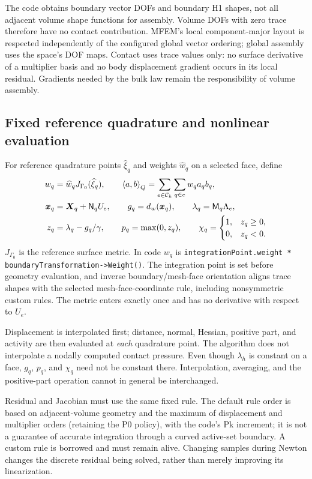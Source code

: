 \documentclass[preprint,11pt]{elsarticle}
\numberwithin{equation}{section}
\newcommand{\bx}{\boldsymbol{x}}
\newcommand{\bX}{\boldsymbol{X}}
\newcommand{\iq}[2]{\left\langle #1,#2\right\rangle_Q}
\newcommand{\code}[1]{\texttt{\nolinkurl{#1}}}
\begin{document}
The code obtains boundary vector DOFs and boundary H1 shapes, not all
adjacent volume shape functions for assembly. Volume DOFs with zero trace
therefore have no contact contribution. MFEM's local component-major
layout is respected independently of the configured global vector ordering;
global assembly uses the space's DOF maps. Contact uses trace values only:
no surface derivative of a multiplier basis and no body displacement
gradient occurs in its local residual. Gradients needed by the bulk law
remain the responsibility of volume assembly.

\subsection{Fixed reference quadrature and nonlinear evaluation}
For reference quadrature points $\widehat{\xi}_q$ and weights
$\widehat w_q$ on a selected face, define
\begin{align}
 w_q&=\widehat w_q J_{\Gamma_0}(\widehat{\xi}_q),\qquad
 \iq{a}{b}=\sum_{e\in\mathcal C_h}\sum_{q\in e}w_q a_qb_q,
 \label{eq:quadrature}\\
 \bx_q&=\bX_q+\mathsf N_q U_e,\qquad
 g_q=d_w(\bx_q),\qquad \lambda_q=\mathsf M_q\Lambda_e,\notag\\
 z_q&=\lambda_q-g_q/\gamma,\qquad
 p_q=\max(0,z_q),\qquad
 \chi_q=\begin{cases}1,&z_q\geq0,\\0,&z_q<0.\end{cases}
 \label{eq:pointkernel}
\end{align}
$J_{\Gamma_0}$ is the reference surface metric. In code $w_q$ is
\code{integrationPoint.weight * boundaryTransformation->Weight()}.
The integration point is set before geometry evaluation, and inverse
boundary/mesh-face orientation aligns trace shapes with the selected
mesh-face-coordinate rule, including nonsymmetric custom rules.
The metric enters exactly once and has no derivative with respect to $U_e$.

Displacement is interpolated first; distance, normal, Hessian, positive
part, and activity are then evaluated at \emph{each} quadrature point.
The algorithm does not interpolate a nodally computed contact pressure.
Even though $\lambda_h$ is constant on a face, $g_q$, $p_q$, and $\chi_q$
need not be constant there. Interpolation, averaging, and the positive-part
operation cannot in general be interchanged.

Residual and Jacobian must use the same fixed rule. The default rule order
is based on adjacent-volume geometry and the maximum of displacement and
multiplier orders (retaining the P0 policy), with the
code's Pk increment; it is not a guarantee of accurate integration through
a curved active-set boundary. A custom rule is borrowed and must remain
alive. Changing samples during Newton changes the discrete residual being
solved, rather than merely improving its linearization.
\end{document}
